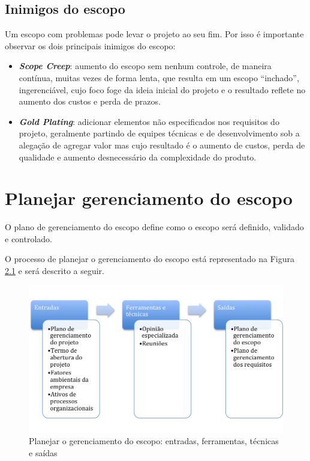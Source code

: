 \section{Inimigos do escopo}

Um escopo com problemas pode levar o projeto ao seu fim. Por isso é importante observar os dois principais inimigos do escopo:

\begin{itemize}
	
	\item \textbf{\textit{Scope Creep}}: aumento do escopo sem nenhum controle, de maneira contínua, muitas vezes de forma lenta, que resulta em um escopo ``inchado'', ingerenciável, cujo foco foge da ideia inicial do projeto e o resultado reflete no aumento dos custos e perda de prazos.
	
	\item \textbf{\textit{Gold Plating}}: adicionar elementos não especificados nos requisitos do projeto, geralmente partindo de equipes técnicas e de desenvolvimento sob a alegação de agregar valor mas cujo resultado é o aumento de custos, perda de qualidade e aumento desnecessário da complexidade do produto.
	
\end{itemize}

\chapter{Planejar gerenciamento do escopo}

O plano de gerenciamento do escopo define como o escopo será definido, validado e controlado.

O processo de planejar o gerenciamento do escopo está representado na Figura \ref{fig:escopo:plan:efts} e será descrito a seguir.

\begin{figure}[!h]
	\centering
	\includegraphics[scale=0.5]{Figuras/escopo_efts_planejar.png}
	\caption{Planejar o gerenciamento do escopo: entradas, ferramentas, técnicas e saídas}
	\label{fig:escopo:plan:efts}
\end{figure}

